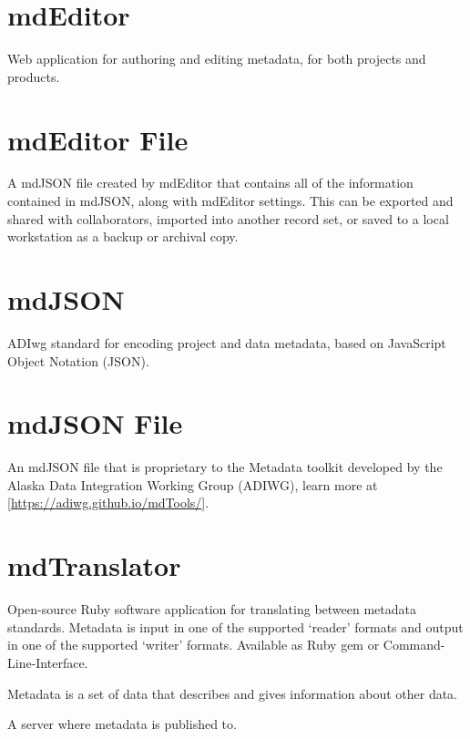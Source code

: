 \documentclass[
]{book}
\begin{document}
\hypertarget{mdeditor}{%
\section{mdEditor}\label{mdeditor}}

Web application for authoring and editing metadata, for both projects and products.

\hypertarget{mdeditor-file}{%
\section{mdEditor File}\label{mdeditor-file}}

A mdJSON file created by mdEditor that contains all of the information contained in mdJSON, along with mdEditor settings. This can be exported and shared with collaborators, imported into another record set, or saved to a local workstation as a backup or archival copy.

\hypertarget{mdjson}{%
\section{mdJSON}\label{mdjson}}

ADIwg standard for encoding project and data metadata, based on JavaScript Object Notation (JSON).

\hypertarget{mdjson-file}{%
\section{mdJSON File}\label{mdjson-file}}

An mdJSON file that is proprietary to the Metadata toolkit developed by the Alaska Data Integration Working Group (ADIWG), learn more at {[}\url{https://adiwg.github.io/mdTools/}{]}.

\hypertarget{mdtranslator}{%
\section{mdTranslator}\label{mdtranslator}}

Open-source Ruby software application for translating between metadata standards. Metadata is input in one of the supported `reader' formats and output in one of the supported `writer' formats. Available as Ruby gem or Command-Line-Interface.

Metadata is a set of data that describes and gives information about other data.

A server where metadata is published to.
\end{document}
